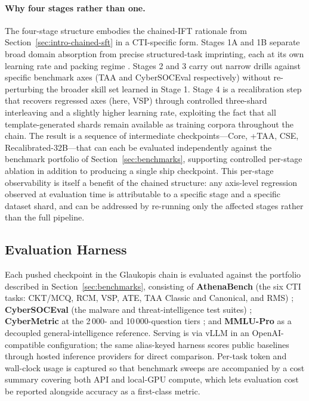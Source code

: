 \documentclass[conference]{IEEEtran}
\begin{document}
\paragraph{Why four stages rather than one.}
The four-stage structure embodies the chained-IFT rationale from Section~\ref{sec:intro-chained-sft} in a CTI-specific form. Stages 1A and 1B separate broad domain absorption from precise structured-task imprinting, each at its own learning rate and packing regime \cite{gururangan2020dontstop,chung2022flant5}. Stages 2 and 3 carry out narrow drills against specific benchmark axes (TAA and CyberSOCEval respectively) without re-perturbing the broader skill set learned in Stage 1. Stage 4 is a recalibration step that recovers regressed axes (here, VSP) through controlled three-shard interleaving and a slightly higher learning rate, exploiting the fact that all template-generated shards remain available as training corpora throughout the chain. The result is a sequence of intermediate checkpoints---Core, +TAA, CSE, Recalibrated-32B---that can each be evaluated independently against the benchmark portfolio of Section~\ref{sec:benchmarks}, supporting controlled per-stage ablation in addition to producing a single ship checkpoint. This per-stage observability is itself a benefit of the chained structure: any axis-level regression observed at evaluation time is attributable to a specific stage and a specific dataset shard, and can be addressed by re-running only the affected stages rather than the full pipeline.

\subsection{Evaluation Harness}
\label{sec:glaukopis-eval}

Each pushed checkpoint in the Glaukopis chain is evaluated against the portfolio described in Section~\ref{sec:benchmarks}, consisting of \textbf{AthenaBench} (the six CTI tasks: CKT/MCQ, RCM, VSP, ATE, TAA Classic and Canonical, and RMS) \cite{alam2025athenabench}; \textbf{CyberSOCEval} (the malware and threat-intelligence test suites) \cite{cybersoceval2025}; \textbf{CyberMetric} at the 2\,000- and 10\,000-question tiers \cite{tihanyi2024cybermetric}; and \textbf{MMLU-Pro} as a decoupled general-intelligence reference. Serving is via vLLM in an OpenAI-compatible configuration; the same alias-keyed harness scores public baselines through hosted inference providers for direct comparison. Per-task token and wall-clock usage is captured so that benchmark sweeps are accompanied by a cost summary covering both API and local-GPU compute, which lets evaluation cost be reported alongside accuracy as a first-class metric.
\end{document}
